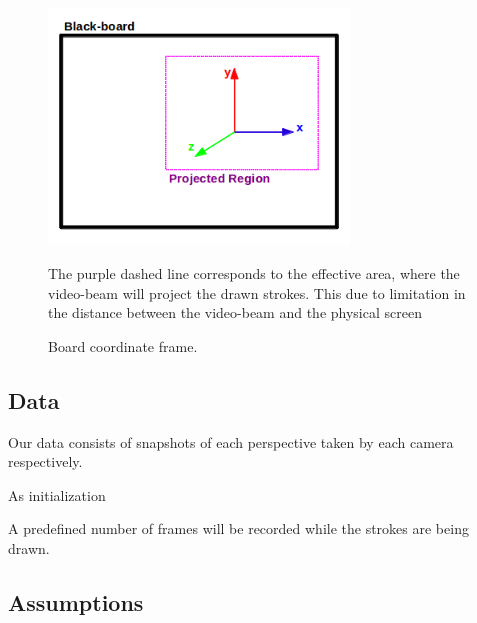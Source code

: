\documentclass[a4paper,12pt]{article}
\begin{document}
\begin{figure}[H]
    \begin{center}
	\includegraphics[width=8cm]{boardCoordinates}
	\caption{Board coordinate frame.}
    The purple dashed line corresponds to the effective area, where the video-beam will project the drawn strokes. This due to limitation in the distance between the video-beam and the physical screen
	\label{fig:board}
    \end{center}
\end{figure}

\subsection*{Data}

Our data consists of snapshots of each perspective taken by each camera respectively. 

As initialization

A predefined number of frames will be recorded while the strokes are being drawn. 



\subsection*{Assumptions}
\end{document}
